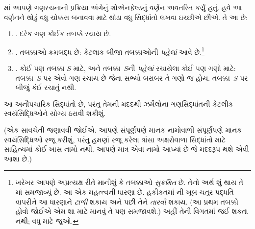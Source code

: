 \documentclass[../../../include/open-logic-section]{subfiles}
\begin{document}

માં આપણે ગણરચનાની પ્રક્રિયા અંગેનું
શોએનફેલ્ડનું વર્ણન અવતરિત કર્યું હતું. હવે આ વર્ણનને થોડું વધુ
ચોક્કસ બનાવવા માટે થોડા વધુ સિદ્ધાંતો લખવા ઇચ્છીએ છીએ. તે આ છે:
\begin{enumerate}
\item[] \stageshier. દરેક ગણ કોઈક તબક્કે રચાય છે.
\item[] \stagesord. તબક્કાઓ ક્રમબદ્ધ છે: કેટલાક બીજા તબક્કાઓની
\emph{પહેલાં} આવે છે.\footnote{ખરેખર આપણે અપ્રત્યક્ષ રીતે
માનીશું કે તબક્કાઓ \emph{સુક્રમિત} છે. તેનો અર્થ શું થાય તે
માં સમજાવ્યું છે. આ એક મહત્ત્વની ધારણા છે.
હકીકતમાં \citet{Scott1974}ની ખૂબ ચતુર પદ્ધતિ વાપરીને આ ધારણાને
\emph{ટાળી} શકાય અને પછી તેને \emph{તારવી} શકાય. (આ પ્રથમ તબક્કો
હોવો જોઈએ એમ શા માટે માનવું તે પણ સમજાવશે.) અહીં તેની વિગતમાં
જઈ શકતા નથી; વધુ માટે \citet{ButtonLT1} જુઓ.}
\item[] \stagesacc. કોઈ પણ તબક્કા $S$ માટે, અને તબક્કા~$S$ની
\emph{પહેલાં} રચાયેલા કોઈ પણ ગણો માટે: તબક્કા~$S$ પર એવો ગણ
રચાય છે જેના સભ્યો બરાબર તે ગણો જ હોય. તબક્કા~$S$ પર બીજું
કંઈ રચાતું નથી.
\end{enumerate}
આ અનૌપચારિક સિદ્ધાંતો છે, પરંતુ તેમની મદદથી ઝર્મેલોના
ગણસિદ્ધાંતની કેટલીક સ્વયંસિદ્ધિઓને યોગ્ય ઠરાવી શકીશું.

(એક સાવચેતી જણાવવી જોઈએ. આપણે સંપૂર્ણપણે માનક નામોવાળી
સંપૂર્ણપણે માનક સ્વયંસિદ્ધિઓ રજૂ કરીશું, પરંતુ હમણાં રજૂ કરેલા
ત્રાંસા અક્ષરોવાળા સિદ્ધાંતો માટે સાહિત્યમાં કોઈ ખાસ નામો નથી.
આપણે માત્ર એવા નામો આપ્યાં છે જે મદદરૂપ થશે એવી આશા છે.)
\end{document}
